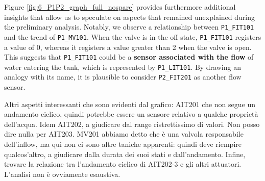 Figure \ref{fig:6_P1P2_graph_full_nospare} provides furthermore additional insights that allow us to speculate on aspects that remained unexplained during the preliminary analysis. Notably, we observe a relationship between \texttt{P1\_FIT101} and the trend of \texttt{P1\_MV101}. When the valve is in the off state, \texttt{P1\_FIT101} registers a value of 0, whereas it registers a value greater than 2 when the valve is open. This suggests that \texttt{P1\_FIT101} could be a \textbf{sensor associated with the flow} of water entering the tank, which is represented by \texttt{P1\_LIT101}. By drawing an analogy with its name, it is plausible to consider \texttt{P2\_FIT201} as another flow sensor.

Altri aspetti interessanti che sono evidenti dal grafico: AIT201 che non segue un andamento ciclico, quindi potrebbe essere un sensore relativo a qualche proprietà dell'acqua. Idem AIT202, a giudicare dal range ristrettissimo di valori. Non posso dire nulla per AIT203. 
MV201 abbiamo detto che è una valvola responsabile dell'inflow, ma qui non ci sono altre taniche apparenti: quindi deve riempire qualcos'altro, a giudicare dalla durata dei suoi stati e dall'andamento. Infine, trovare la relazione tra l'andamento ciclico di AIT202-3 e gli altri attuatori. L'analisi non è ovviamente esaustiva.


		
		
